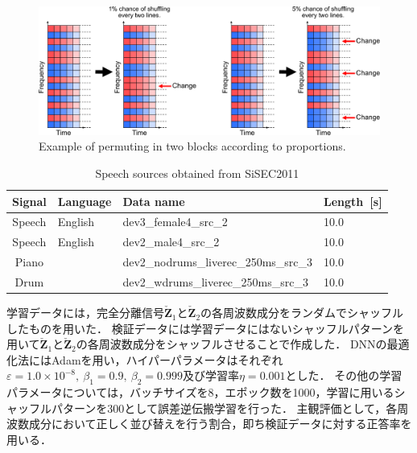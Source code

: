 \begin{figure}[t]
    \begin{center}
        \includegraphics[width=1.0\columnwidth]{figures/1ratio_5ratio_permutation.pdf}
    \end{center}
	\caption{Example of permuting in two blocks according to proportions.}
	\label{fig:1_5ratio_perm}
\end{figure}

\begin{table}[t]
\begin{center}
 \caption{Speech sources obtained from SiSEC2011}
 \label{table:wav}
  \begin{tabular}{clll}\hline \hline
   Signal & Language & Data name &Length~[s]  \\ \hline
   Speech & English & dev3\_female4\_src\_2 & 10.0  \\ \hline
   Speech & English & dev2\_male4\_src\_2 &  10.0 \\ \hline
   Piano  & & dev2\_nodrums\_liverec\_250ms\_src\_3 & 10.0\\ \hline
   Drum  & & dev2\_wdrums\_liverec\_250ms\_src\_3 & 10.0 \\ \hline 
   \hline
  \end{tabular}
 \end{center}
\end{table}

学習データには，完全分離信号$\check{\bm{Z}}_1$と$\check{\bm{Z}}_2$の各周波数成分をランダムでシャッフルしたものを用いた．
検証データには学習データにはないシャッフルパターンを用いて$\check{\bm{Z}}_1$と$\check{\bm{Z}}_2$の各周波数成分をシャッフルさせることで作成した．
DNNの最適化法にはAdam\cite{adam}を用い，ハイパーパラメータはそれぞれ$\varepsilon=1.0\times10^{-8},~\beta_1 = 0.9,~\beta_2 = 0.999$及び学習率$\eta=0.001$とした．
その他の学習パラメータについては，バッチサイズを8，エポック数を1000，学習に用いるシャッフルパターンを300として誤差逆伝搬学習を行った．
主観評価として，各周波数成分において正しく並び替えを行う割合，即ち検証データに対する正答率を用いる．

